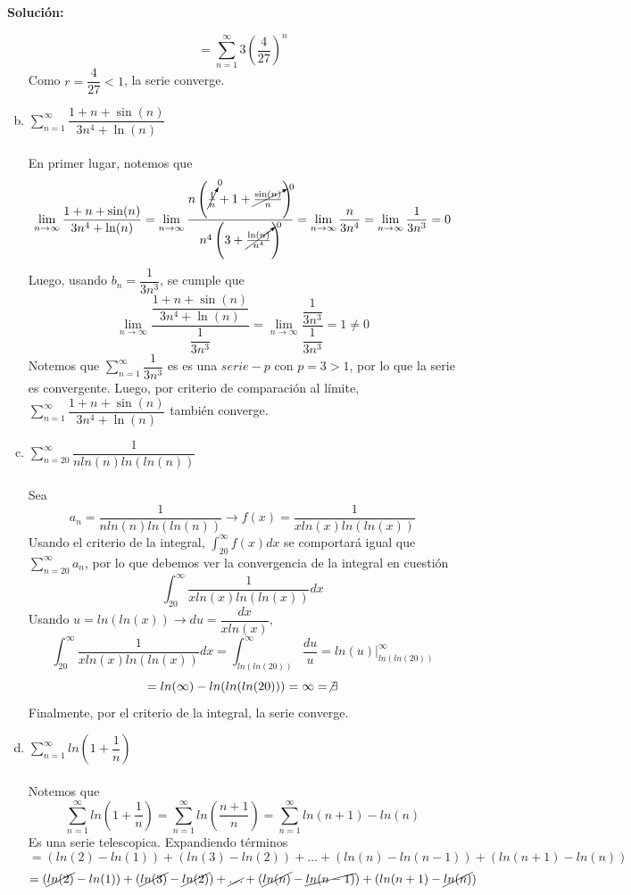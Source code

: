 \documentclass[12pt]{article}
\newenvironment{solucion}
{\begin{mdframed}[backgroundcolor=black!10]
		{\bf Solución:}\\
	}
	{
	\end{mdframed}
}
\newenvironment{preguntas}
{\begin{enumerate}\itemsep12pt
	}
	{
	\end{enumerate}
}
\newcommand{\ev}{\Big|}
\newcommand{\ra}{\rightarrow}
\begin{document}
\begin{preguntas}
\begin{solucion}
\begin{enumerate}[a)]
$$= \sum\limits_{n=1}^{\infty} 3 \left(\dfrac{4}{27}\right)^n$$
			Como $r = \dfrac{4}{27} <1$, la serie converge.
\item $\sum\limits_{n=1}^{\infty}\dfrac{1 + n + \sin(n)}{3n^4 + \ln(n)}$\\
			\\
En primer lugar, notemos que
$$\lim\limits_{n\ra \infty} \dfrac{1 + n + \sin(n)}{3n^4 + \ln(n)}
= \lim\limits_{n\ra \infty} \dfrac{n\left(\cancelto{0}{\frac{1}{n}} + 1 + \cancelto{0}{\frac{\sin(n)}{n}}\right)}{n^4\left(3 + \cancelto{0}{\frac{\ln(n)}{n^4}}\right)}
= \lim\limits_{n\ra \infty} \dfrac{n}{3n^4}
= \lim\limits_{n\ra \infty} \dfrac{1}{3n^3} = 0$$
Luego, usando $b_n = \dfrac{1}{3n^3}$, se cumple que
$$\lim\limits_{n\ra \infty} \dfrac{\dfrac{1 + n + \sin(n)}{3n^4 + \ln(n)}}{\dfrac{1}{3n^3}}
= \lim\limits_{n\ra \infty} \dfrac{\dfrac{1}{3n^3}}{\dfrac{1}{3n^3}} 
= 1 \neq 0$$
Notemos que $\sum\limits_{n=1}^{\infty} \dfrac{1}{3n^3}$ es es una $serie-p$ con $p=3>1$, por lo que la serie es convergente. Luego, por criterio de comparación al límite, $\sum\limits_{n=1}^{\infty}\dfrac{1 + n + \sin(n)}{3n^4 + \ln(n)}$ también converge.
\item $\sum\limits_{n=20}^{\infty}\dfrac{1}{nln(n)ln(ln(n))}$\\
			\\
			Sea
			$$a_n = \dfrac{1}{nln(n)ln(ln(n))} \ra f(x) = \dfrac{1}{xln(x)ln(ln(x))}$$
			Usando el criterio de la integral, $\displaystyle\int_{20}^{\infty}f(x)dx$ se comportará igual que $\sum\limits_{n=20}^{\infty} a_n$, por lo que debemos ver la convergencia de la integral en cuestión
			$$\int_{20}^{\infty} \dfrac{1}{xln(x)ln(ln(x))} dx$$
			Usando $u=ln(ln(x)) \ra du = \dfrac{dx}{xln(x)}$,
			$$\int_{20}^{\infty} \dfrac{1}{xln(x)ln(ln(x))} dx
			= \int_{ln(ln(20))}^{\infty} \dfrac{du}{u} = ln(u) \ev_{ln(ln(20))}^{\infty}$$
			$$ = ln(\infty) - ln(ln(ln(20))) = \infty = \not \exists$$
			Finalmente, por el criterio de la integral, la serie converge.
\item  $\sum\limits_{n=1}^{\infty}ln\left(1+\dfrac{1}{n}\right)$\\
			\\
			Notemos que
			$$\sum\limits_{n=1}^{\infty} ln\left(1+\dfrac{1}{n}\right)
			= \sum\limits_{n=1}^{\infty} ln\left(\dfrac{n+1}{n}\right)
			= \sum\limits_{n=1}^{\infty} ln(n+1)-ln(n)$$
			Es una serie telescopica. Expandiendo términos
			$$= (ln(2)-ln(1)) + (ln(3)-ln(2)) + \dots + (ln(n) - ln(n-1)) + (ln(n+1) - ln(n))$$
			$$= (\cancel{ln(2)}-ln(1)) + (\cancel{ln(3)}-\cancel{ln(2)}) + \cancel{\dots} + (\cancel{ln(n)} - \cancel{ln(n-1)}) + (ln(n+1) - \cancel{ln(n)})$$

\end{enumerate}
\end{solucion}
\end{preguntas}
\end{document}
